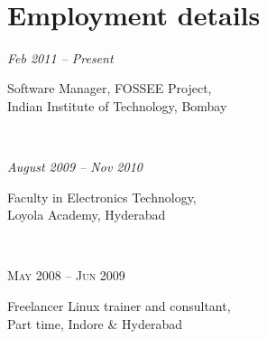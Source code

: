 \documentclass[10pt]{article} %
\begin{document}
\color{text1} %


\par{\\ %


\begin{minipage}[t]{0.5\textwidth} %
\vspace{0pt} %


\section{Employment details}

\smallskip
{\raggedright\textit{Feb 2011 -- Present}\par}
{\raggedright\large Software Manager, FOSSEE Project, \\
Indian Institute of Technology, Bombay}\\
\smallskip

{\raggedright\textit{August 2009 -- Nov 2010}\par}
{\raggedright\large Faculty in Electronics Technology, \\
Loyola Academy, Hyderabad}\\
\smallskip

{\raggedright\textsc{May 2008 -- Jun 2009}\par}
{\raggedright\large Freelancer Linux trainer and consultant, \\
Part time, Indore \& Hyderabad}\\


\end{minipage}}
\end{document}
